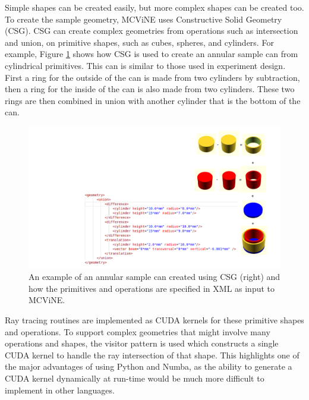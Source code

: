 \vspace{1mm}

\vspace{1mm}

Simple shapes can be created easily, but more complex shapes can be created too.
To create the sample geometry, MCViNE uses Constructive Solid Geometry (CSG). 
CSG can create complex geometries from operations such as intersection and union, on primitive shapes, such as cubes, spheres, and cylinders. 
For example, Figure \ref{fig:csg} shows how CSG is used to create an annular sample can from cylindrical primitives. This can is similar to those used in experiment design\cite{PhysRevB.107.094511}.
First a ring for the outside of the can is made from two cylinders by subtraction, then a ring for the inside of the can is also made from two cylinders.  These two rings are then combined in union with another cylinder that is the bottom of the can. 

\begin{figure}[h]
    \centering
    \includegraphics[trim = {1.2cm 0 4cm 0 }, width=\columnwidth]{figures/mcvine_CSG_example.png}
    \caption{An example of an annular sample can  created using CSG (right) and how the primitives and operations are specified in XML as input to MCViNE.}
    \label{fig:csg}
\end{figure}

Ray tracing routines are implemented as CUDA kernels for these primitive shapes and operations. To support complex geometries that might involve many operations and shapes, the visitor pattern is used which constructs a single CUDA kernel to handle the ray intersection of that shape. This highlights one of the major advantages of using Python and Numba, as the ability to generate a CUDA kernel dynamically at run-time would be much more difficult to implement in other languages.

